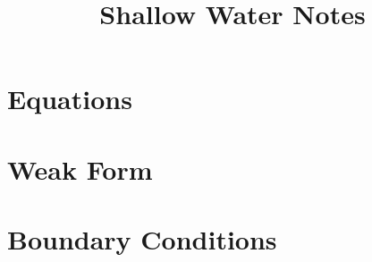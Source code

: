 \documentclass{mathnotes}
\title{Shallow Water Notes}
\begin{document}
\maketitle

\section{Equations}

\section{Weak Form}

\section{Boundary Conditions}

%  
%    
%  
\end{document}
